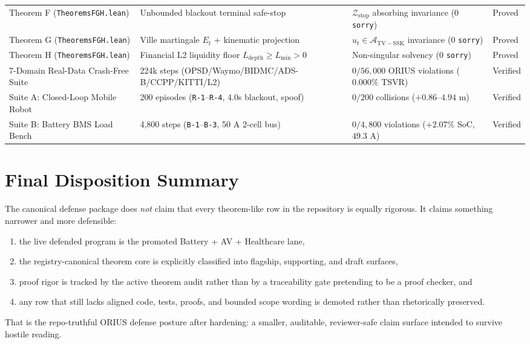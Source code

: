 \documentclass[11pt,oneside]{report}
\begin{document}
\begin{longtable}{p{}p{}p{}p{}}
Theorem F (\texttt{TheoremsFGH.lean}) & Unbounded blackout terminal safe-stop & $\mathcal{Z}_{\mathrm{stop}}$ absorbing invariance (0 \texttt{sorry}) & Proved\\
Theorem G (\texttt{TheoremsFGH.lean}) & Ville martingale $E_t$ + kinematic projection & $u_t \in \mathcal{A}_{\mathrm{TV-SSK}}$ invariance (0 \texttt{sorry}) & Proved\\
Theorem H (\texttt{TheoremsFGH.lean}) & Financial L2 liquidity floor $L_{\mathrm{depth}}\ge L_{\min}>0$ & Non-singular solvency (0 \texttt{sorry}) & Proved\\
7-Domain Real-Data Crash-Free Suite & 224k steps (OPSD/Waymo/BIDMC/ADS-B/CCPP/KITTI/L2) & $0 / 56,000$ ORIUS violations ($0.000\%$ TSVR) & Verified\\
Suite A: Closed-Loop Mobile Robot & 200 episodes (\texttt{R-1}--\texttt{R-4}, 4.0s blackout, spoof) & $0 / 200$ collisions ($+0.86\text{--}4.94\text{ m}$) & Verified\\
Suite B: Battery BMS Load Bench & 4,800 steps (\texttt{B-1}--\texttt{B-3}, 50 A 2-cell bus) & $0 / 4,800$ violations ($+2.07\%$ SoC, $49.3\text{ A}$) & Verified\\
\bottomrule
\end{longtable}

\chapter{Final Disposition Summary}
The canonical defense package does \emph{not} claim that every theorem-like row
in the repository is equally rigorous. It claims something narrower and more
defensible:
\begin{enumerate}
\item the live defended program is the promoted Battery + AV + Healthcare lane,
\item the registry-canonical theorem core is explicitly classified into flagship, supporting, and draft surfaces,
\item proof rigor is tracked by the active theorem audit rather than by a traceability gate pretending to be a proof checker, and
\item any row that still lacks aligned code, tests, proofs, and bounded scope wording is demoted rather than rhetorically preserved.
\end{enumerate}

That is the repo-truthful ORIUS defense posture after hardening: a smaller,
auditable, reviewer-safe claim surface intended to survive hostile reading.
\end{document}

